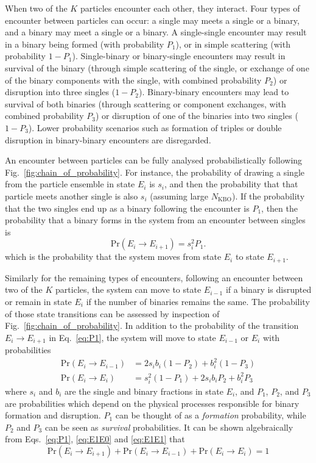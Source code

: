 \documentclass[a4paper,12pt]{article}
\begin{document}
When two of the $K$ particles encounter each other, they interact. Four types of encounter between particles can occur: a single may meets a single or a binary, and a binary may meet a single or a binary. A single-single encounter may result in a binary being formed (with probability $P_1$), or in simple scattering (with probability $1-P_1$). Single-binary or binary-single encounters may result in survival of the binary (through simple scattering of the single, or exchange of one of the binary components with the single, with combined probability $P_2$) or disruption into three singles ($1-P_2$). Binary-binary encounters may lead to survival of both binaries (through scattering or component exchanges, with combined probability $P_3$) or disruption of one of the binaries into two singles ($1-P_3$). Lower probability scenarios such as formation of triples or double disruption in binary-binary encounters are disregarded.

An encounter between particles can be fully analysed probabilistically following Fig.~\ref{fig:chain_of_probability}. For instance, the probability of drawing a single from the particle ensemble in state $E_i$ is $s_i$, and then the probability that that particle meets another single is also $s_i$ (assuming large $N_\text{KBO}$). If the probability that the two singles end up as a binary following the encounter is $P_1$, then the probability that a binary forms in the system from an encounter between singles is
\begin{equation} \label{eq:P1}
\text{Pr}(E_i\rightarrow E_{i+1}) = s_i^2 P_1.
\end{equation}
\noindent which is the probability that the system moves from state $E_i$ to state $E_{i+1}$.

Similarly for the remaining types of encounters, following an encounter between two of the $K$ particles, the system can move to state $E_{i-1}$ if a binary is disrupted or remain in state $E_i$ if the number of binaries remains the same.  The probability of those state transitions can be assessed by inspection of Fig.~\ref{fig:chain_of_probability}.  In addition to the probability of the transition $E_i\rightarrow E_{i+1}$ in Eq.~\eqref{eq:P1}, the system will move to state $E_{i-1}$ or $E_i$ with probabilities
\begin{align}
\text{Pr}(E_i\rightarrow E_{i-1}) &= 2 s_i b_i (1-P_2) + b_i^2 (1-P_3) \label{eq:E1E0} \\
\text{Pr}(E_i\rightarrow E_i) &= s_i^2 (1-P_1) + 2 s_i b_i P_2 + b_i^2 P_3 \label{eq:E1E1}
\end{align}
where $s_i$ and $b_i$ are the single and binary fractions in state $E_i$, and $P_1$, $P_2$, and $P_3$ are probabilities which depend on the physical processes responsible for binary formation and disruption. $P_1$ can be thought of as a \textit{formation} probability, while $P_2$ and $P_3$ can be seen as \textit{survival} probabilities. It can be shown algebraically from Eqs.\ \eqref{eq:P1}, \eqref{eq:E1E0} and \eqref{eq:E1E1} that
\begin{equation} \label{eq:Ptot}
\text{Pr}(E_i\rightarrow E_{i+1}) + \text{Pr}(E_i\rightarrow E_{i-1}) + \text{Pr}(E_i\rightarrow E_i)=1
\end{equation}
\end{document}
